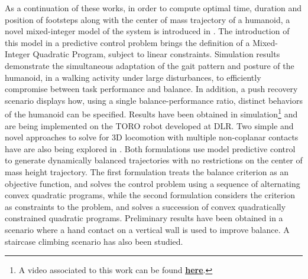 \documentclass[final,5p,twocolumn]{elsarticle}
\begin{document}
As a  continuation of these works, in order to compute optimal time, duration and position of footsteps along with the center of mass trajectory of a humanoid, a novel mixed-integer model of the system is introduced in \cite{ibanezIROS2014}. The introduction of this model in a predictive control problem brings the definition of a Mixed-Integer Quadratic Program, subject to linear constraints. Simulation results demonstrate the simultaneous adaptation of the gait pattern and posture of the humanoid, in a walking activity under large disturbances, to efficiently compromise between task performance and balance. In addition, a push recovery scenario displays how, using a single balance-performance ratio, distinct behaviors of the humanoid can be specified. Results have been obtained in simulation\footnote{A video associated to this work can be found \href{http://pages.isir.upmc.fr/~padois/website/fichiers/videos/ibanez\_IROS2014.mp4}{\textbf{\underline{here}}}.} and are being implemented on the TORO robot developed at DLR. Two simple and novel approaches to solve for 3D locomotion with multiple non-coplanar contacts have are also being explored in \cite{perrin2015}. Both formulations use model predictive control to generate dynamically balanced trajectories with no restrictions on the center of mass height trajectory. The first formulation treats the balance criterion as an objective function, and solves the control problem using a sequence of alternating convex quadratic programs, while the second formulation considers the criterion as constraints to the problem, and solves a succession of convex quadratically constrained quadratic programs. Preliminary results have been obtained in a scenario where a hand contact on a vertical wall is used to improve balance. A staircase climbing scenario has also been studied.\\
\end{document}
